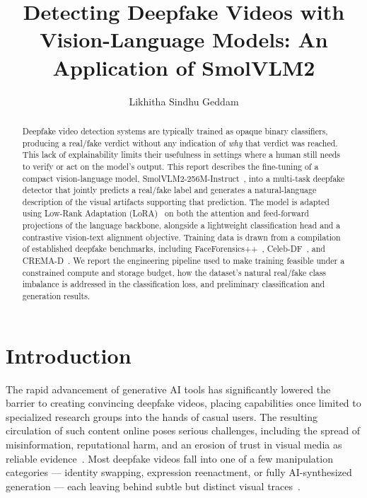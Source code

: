 \documentclass[acmsmall,review=false]{acmart}
\title{Detecting Deepfake Videos with Vision-Language Models: An Application of SmolVLM2}
\author{Likhitha Sindhu Geddam}
\affiliation{%
  \institution{Research Internship, IIIT Bangalore}
  \country{India}
}
\begin{document}
\begin{abstract}
Deepfake video detection systems are typically trained as opaque binary
classifiers, producing a real/fake verdict without any indication of \emph{why}
that verdict was reached. This lack of explainability limits their usefulness
in settings where a human still needs to verify or act on the model's output.
This report describes the fine-tuning of a compact vision-language model,
SmolVLM2-256M-Instruct~\citep{marafioti2025smolvlm}, into a multi-task deepfake
detector that jointly predicts a real/fake label and generates a natural-language
description of the visual artifacts supporting that prediction. The model is
adapted using Low-Rank Adaptation (LoRA)~\citep{hu2021lora} on both the attention
and feed-forward projections of the language backbone, alongside a lightweight
classification head and a contrastive vision-text alignment objective. Training
data is drawn from a compilation of established deepfake benchmarks, including
FaceForensics++~\citep{rossler2019faceforensics}, Celeb-DF~\citep{li2020celebdf},
and CREMA-D~\citep{cao2014cremad}. We report the engineering pipeline used to make
training feasible under a constrained compute and storage budget, how the
dataset's natural real/fake class imbalance is addressed in the classification
loss, and preliminary classification and generation results.
\end{abstract}

\maketitle

\section{Introduction}

The rapid advancement of generative AI tools has significantly lowered the
barrier to creating convincing deepfake videos, placing capabilities once
limited to specialized research groups into the hands of casual users. The
resulting circulation of such content online poses serious challenges,
including the spread of misinformation, reputational harm, and an erosion of
trust in visual media as reliable evidence~\citep{hondru2025exddv}. Most
deepfake videos fall into one of a few manipulation categories --- identity
swapping, expression reenactment, or fully AI-synthesized generation --- each
leaving behind subtle but distinct visual traces~\citep{rossler2019faceforensics}.
\end{document}

